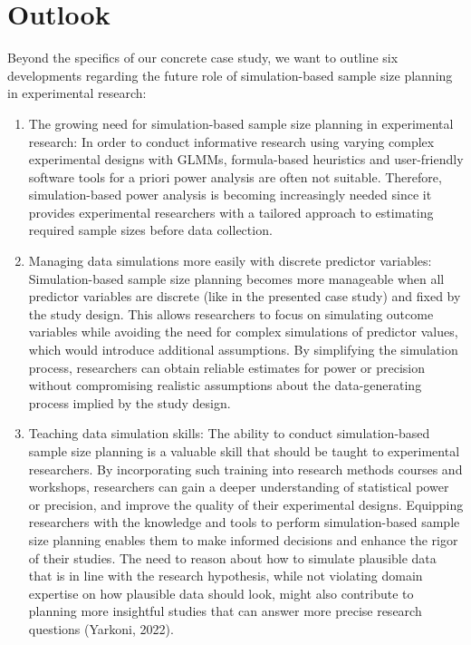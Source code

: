 \documentclass[
  man,floatsintext]{apa6}
\begin{document}
\hypertarget{outlook}{%
\section{Outlook}\label{outlook}}

Beyond the specifics of our concrete case study, we want to outline six developments regarding the future role of simulation-based sample size planning in experimental research:

\begin{enumerate}
\def\labelenumi{\arabic{enumi}.}
\item
  The growing need for simulation-based sample size planning in experimental research: In order to conduct informative research using varying complex experimental designs with GLMMs, formula-based heuristics and user-friendly software tools for a priori power analysis are often not suitable. Therefore, simulation-based power analysis is becoming increasingly needed since it provides experimental researchers with a tailored approach to estimating required sample sizes before data collection.
\item
  Managing data simulations more easily with discrete predictor variables: Simulation-based sample size planning becomes more manageable when all predictor variables are discrete (like in the presented case study) and fixed by the study design.
  This allows researchers to focus on simulating outcome variables while avoiding the need for complex simulations of predictor values, which would introduce additional assumptions. By simplifying the simulation process, researchers can obtain reliable estimates for power or precision without compromising realistic assumptions about the data-generating process implied by the study design.
\item
  Teaching data simulation skills: The ability to conduct simulation-based sample size planning is a valuable skill that should be taught to experimental researchers. By incorporating such training into research methods courses and workshops, researchers can gain a deeper understanding of statistical power or precision, and improve the quality of their experimental designs.
  Equipping researchers with the knowledge and tools to perform simulation-based sample size planning enables them to make informed decisions and enhance the rigor of their studies.
  The need to reason about how to simulate plausible data that is in line with the research hypothesis, while not violating domain expertise on how plausible data should look, might also contribute to planning more insightful studies that can answer more precise research questions (Yarkoni, 2022).

\end{enumerate}
\end{document}
